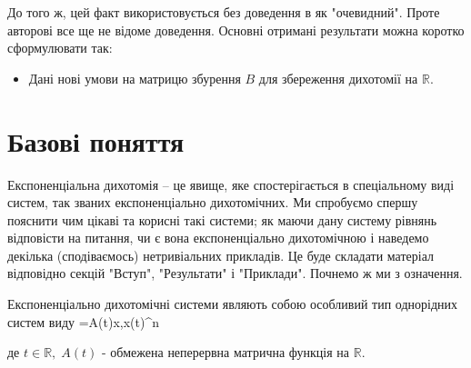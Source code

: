 \documentclass[14pt]{extarticle} %
\theoremstyle{remark}
\begin{document}
	До того ж, цей факт використовується без доведення в \cite[ст. 37]{mitrop} як "очевидний". Проте авторові все ще не відоме доведення.
Основні отримані результати можна коротко сформулювати так:
\begin{itemize}
	\item Дані нові умови на матрицю збурення $B$ для збереження дихотомії на $\mathbb{R}$.
\end{itemize}
\section{Базові поняття}
Експоненціальна дихотомія -- це явище, яке спостерігається в спеціальному виді систем, так званих експоненціально дихотомічних.
Ми спробуємо спершу пояснити чим цікаві та корисні такі системи; як маючи дану систему рівнянь відповісти на питання, чи
є вона експоненціально дихотомічною і наведемо декілька (сподіваємось) нетривіальних прикладів. Це буде складати матеріал
відповідно секцій "Вступ"{}, "Результати" і "Приклади". 
Почнемо ж ми з означення.

Експоненціально дихотомічні системи являють собою особливий тип однорідних систем виду
\equation\label{LinHomSysDef}=A(t)x,\;x(t)\in{}^n\endequation

де $t\in\mathbb{R},\; A(t)$ - обмежена неперервна матрична функція на $\mathbb{R}$. 
\end{document}
